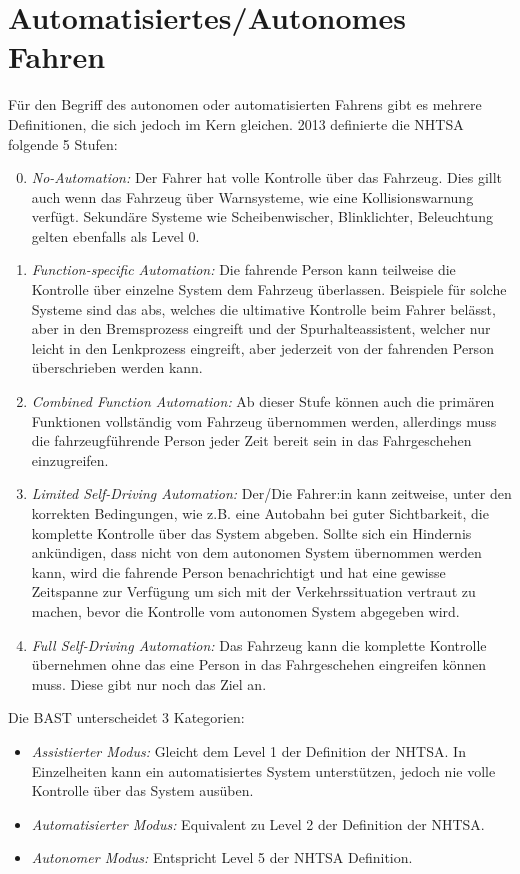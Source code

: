 \documentclass[conference,compsoc,final,a4paper]{IEEEtran}
\begin{document}
\section{Automatisiertes/Autonomes Fahren}
Für den Begriff des autonomen oder automatisierten Fahrens gibt es mehrere Definitionen, die sich jedoch im Kern gleichen.
2013 definierte die \ac{NHTSA} folgende 5 Stufen\cite{NHTSA2013}:
\begin{enumerate}
  \setcounter{enumi}{-1}
  \item \emph{No-Automation:} Der Fahrer hat volle Kontrolle über das Fahrzeug. Dies gillt auch wenn das Fahrzeug über Warnsysteme, wie eine Kollisionswarnung verfügt. Sekundäre Systeme wie Scheibenwischer, Blinklichter, Beleuchtung gelten ebenfalls als Level 0.
  \item \emph{Function-specific Automation:} Die fahrende Person kann teilweise die Kontrolle über einzelne System dem Fahrzeug überlassen. Beispiele für solche Systeme sind das \ac{abs}, welches die ultimative Kontrolle beim Fahrer belässt, aber in den Bremsprozess eingreift und der Spurhalteassistent, welcher nur leicht in den Lenkprozess eingreift, aber jederzeit von der fahrenden Person überschrieben werden kann.
  \item \emph{Combined Function Automation:} Ab dieser Stufe können auch die primären Funktionen vollständig vom Fahrzeug übernommen werden, allerdings muss die fahrzeugführende Person jeder Zeit bereit sein in das Fahrgeschehen einzugreifen.
  \item \emph{Limited Self-Driving Automation:} Der/Die Fahrer:in kann zeitweise, unter den korrekten Bedingungen, wie z.B. eine Autobahn bei guter Sichtbarkeit, die komplette Kontrolle über das System abgeben. Sollte sich ein Hindernis ankündigen, dass nicht von dem autonomen System übernommen werden kann, wird die fahrende Person benachrichtigt und hat eine gewisse Zeitspanne zur Verfügung um sich mit der Verkehrssituation vertraut zu machen, bevor die Kontrolle vom autonomen System abgegeben wird.
  \item \emph{Full Self-Driving Automation:} Das Fahrzeug kann die komplette Kontrolle übernehmen ohne das eine Person in das Fahrgeschehen eingreifen können muss. Diese gibt nur noch das Ziel an.
\end{enumerate}

Die \ac{BAST} unterscheidet 3 Kategorien\cite{bast2021}:

\begin{itemize}
  \item \emph{Assistierter Modus:} Gleicht dem Level 1 der Definition der \ac{NHTSA}. In Einzelheiten kann ein automatisiertes System unterstützen, jedoch nie volle Kontrolle über das System ausüben.
  \item \emph{Automatisierter Modus:} Equivalent zu Level 2 der Definition der \ac{NHTSA}.
  \item \emph{Autonomer Modus:} Entspricht Level 5 der \ac{NHTSA} Definition.
\end{itemize}
\end{document}
